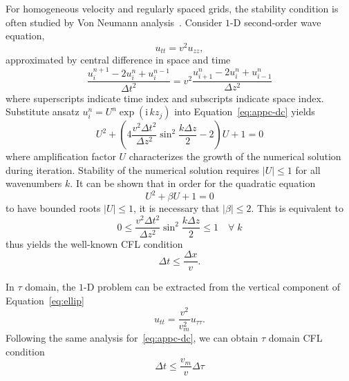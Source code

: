 For homogeneous velocity and regularly spaced grids, the stability condition is often studied by Von Neumann analysis~\cite[]{trefethen:fd}. Consider $1$-D second-order wave equation,
\begin{equation}\label{eq:appc-wc}
u_{tt} = v^2 u_{zz} ,
\end{equation}
approximated by central difference in space and time
\begin{equation}\label{eq:appc-dc}
\frac{u_i^{n+1} - 2 u_i^n + u_i^{n-1}}{\Delta t^2} = v^2 \frac{u_{i+1}^n - 2 u_i^n + u_{i-1}^n}{\Delta z^2}
\end{equation}
where superscripts indicate time index and subscripts indicate space index.
Substitute ansatz $u_i^n = U^n\exp\left(\mathrm{i} \, k z_j\right)$ into Equation~\ref{eq:appc-dc} yields
\begin{equation}
U^2 + \left( 4 \frac{v^2\Delta t^2}{\Delta z^2} \sin^2\frac{k\Delta z}{2} - 2 \right) U + 1 = 0
\end{equation}
where amplification factor $U$ characterizes the growth of the numerical solution during iteration. Stability of the numerical solution requires $\lvert U\rvert \leq 1$ for all wavenumbers $k$. It can be shown that in order for the quadratic equation
\begin{equation}
U^2 + \beta U + 1 = 0 %
\end{equation}
to have bounded roots $\lvert U\rvert \leq 1$, it is necessary that $\lvert\beta\rvert \leq 2$. This is equivalent to
\begin{equation}
0 \leq \frac{v^2\Delta t^2}{\Delta z^2} \sin^2\frac{k\Delta z}{2} \leq 1  \quad \forall \; k
\end{equation}
thus yields the well-known CFL condition
\begin{equation}\label{eq:cfl-c}
\Delta t \leq \frac{\Delta x}{v} .
\end{equation}

In $\tau$ domain, the $1$-D problem can be extracted from the vertical component of Equation~\ref{eq:ellip}
\begin{equation}\label{eq:appc-wt}
u_{tt} = \frac{v^2}{v_m^2} u_{\tau\tau} .
\end{equation}
Following the same analysis for~\ref{eq:appc-dc}, we can obtain $\tau$ domain CFL condition
\begin{equation}\label{eq:cfl-t}
\Delta t \leq \frac{v_m}{v} \Delta \tau
\end{equation}





